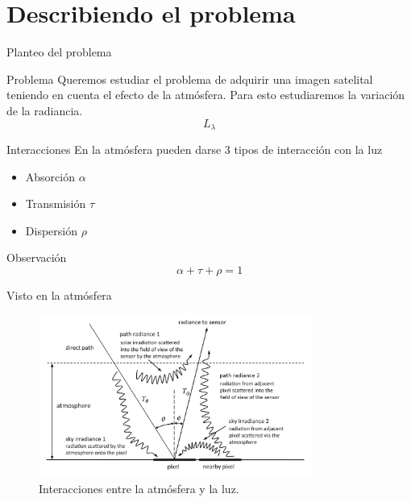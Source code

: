 \documentclass[handout]{beamer}
\begin{document}
\section{Describiendo el problema}

\begin{frame}{Planteo del problema}
  \begin{block}{Problema}
    Queremos estudiar el problema de adquirir una imagen satelital teniendo en cuenta el efecto de la atmósfera.\pause
    Para esto estudiaremos la variación de la radiancia.
    $$L_\lambda$$
  \end{block}
\end{frame}

\begin{frame}{Interacciones}
  En la atmósfera pueden darse 3 tipos de interacción con la luz\pause
    \begin{itemize}[<+->]
      \item Absorción $\alpha$
      \item Transmisión $\tau$
      \item Dispersión $\rho$
    \end{itemize}\pause
    \begin{block}{Observación}
      \begin{equation}
        \alpha + \tau + \rho = 1
      \end{equation}
    \end{block}
\end{frame}

\begin{frame}{Visto en la atmósfera}
  \begin{figure}
  \centering
  \includegraphics[width=0.8\textwidth]{imagenes/iatmo.png}
  \caption{Interacciones entre la atmósfera y la luz.}
  \end{figure}
\end{frame}
\end{document}
